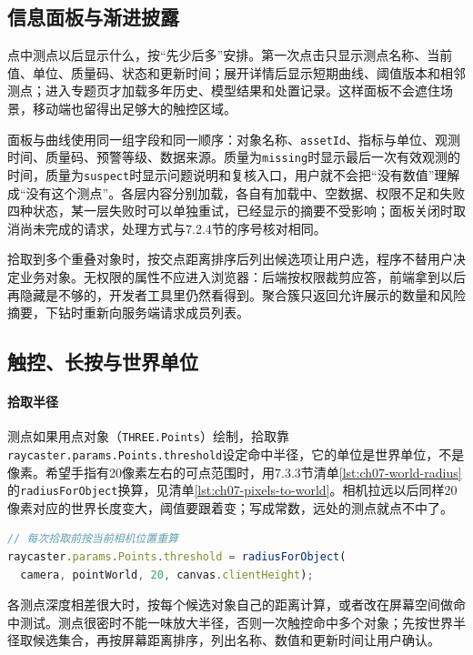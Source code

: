 \subsection{信息面板与渐进披露}

点中测点以后显示什么，按“先少后多”安排。第一次点击只显示测点名称、当前值、单位、质量码、状态和更新时间；展开详情后显示短期曲线、阈值版本和相邻测点；进入专题页才加载多年历史、模型结果和处置记录。这样面板不会遮住场景，移动端也留得出足够大的触控区域。

面板与曲线使用同一组字段和同一顺序：对象名称、\texttt{assetId}、指标与单位、观测时间、质量码、预警等级、数据来源。质量为\texttt{missing}时显示最后一次有效观测的时间，质量为\texttt{suspect}时显示问题说明和复核入口，用户就不会把“没有数值”理解成“没有这个测点”。各层内容分别加载，各自有加载中、空数据、权限不足和失败四种状态，某一层失败时可以单独重试，已经显示的摘要不受影响；面板关闭时取消尚未完成的请求，处理方式与7.2.4节的序号核对相同。

拾取到多个重叠对象时，按交点距离排序后列出候选项让用户选，程序不替用户决定业务对象。无权限的属性不应进入浏览器：后端按权限裁剪应答，前端拿到以后再隐藏是不够的，开发者工具里仍然看得到。聚合簇只返回允许展示的数量和风险摘要，下钻时重新向服务端请求成员列表。

\subsection{触控、长按与世界单位}

\paragraph{拾取半径}测点如果用点对象（\texttt{THREE.Points}）绘制，拾取靠\texttt{raycaster.params.Points.threshold}设定命中半径，它的单位是世界单位，不是像素。希望手指有20像素左右的可点范围时，用7.3.3节清单\ref{lst:ch07-world-radius}的\texttt{radiusForObject}换算，见清单\ref{lst:ch07-pixels-to-world}。相机拉远以后同样20像素对应的世界长度变大，阈值要跟着变；写成常数，远处的测点就点不中了。

\begin{lstlisting}[label={lst:ch07-pixels-to-world},language=JavaScript,caption={按20像素设定点对象的拾取半径}]
// 每次拾取前按当前相机位置重算
raycaster.params.Points.threshold = radiusForObject(
  camera, pointWorld, 20, canvas.clientHeight);
\end{lstlisting}

各测点深度相差很大时，按每个候选对象自己的距离计算，或者改在屏幕空间做命中测试。测点很密时不能一味放大半径，否则一次触控命中多个对象；先按世界半径取候选集合，再按屏幕距离排序，列出名称、数值和更新时间让用户确认。

